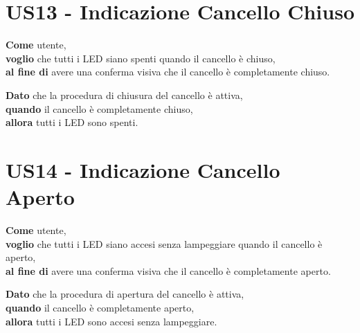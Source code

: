 \section{US13 - Indicazione Cancello Chiuso}
\begin{tcolorbox}[title={Descrizione}, colback=red!20!white, colframe=red!80!black]
    \textbf{Come} utente, \\
    \textbf{voglio} che tutti i LED siano spenti quando il cancello è chiuso, \\
    \textbf{al fine di} avere una conferma visiva che il cancello è completamente chiuso.
\end{tcolorbox}

\begin{tcolorbox}[title={Criterio di Accettazione}, colback=blue!20!white, colframe=blue!80!black]
    \textbf{Dato} che la procedura di chiusura del cancello è attiva, \\
    \textbf{quando} il cancello è completamente chiuso, \\
    \textbf{allora} tutti i LED sono spenti.
\end{tcolorbox}

\section{US14 - Indicazione Cancello Aperto}
\begin{tcolorbox}[title={Descrizione}, colback=red!20!white, colframe=red!80!black]
    \textbf{Come} utente, \\
    \textbf{voglio} che tutti i LED siano accesi senza lampeggiare quando il cancello è aperto, \\
    \textbf{al fine di} avere una conferma visiva che il cancello è completamente aperto.
\end{tcolorbox}

\begin{tcolorbox}[title={Criterio di Accettazione}, colback=blue!20!white, colframe=blue!80!black]
    \textbf{Dato} che la procedura di apertura del cancello è attiva, \\
    \textbf{quando} il cancello è completamente aperto, \\
    \textbf{allora} tutti i LED sono accesi senza lampeggiare.
\end{tcolorbox}